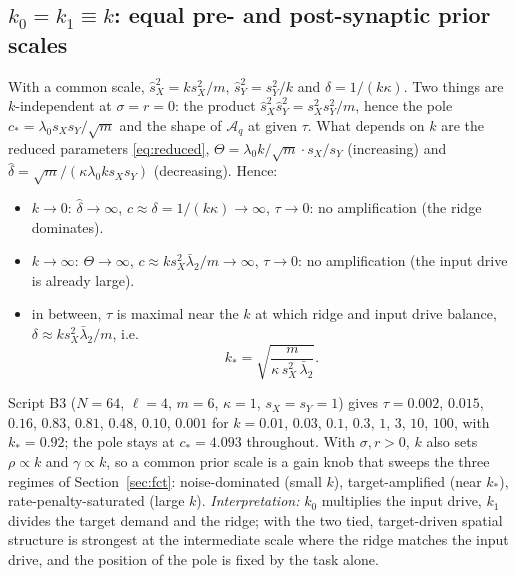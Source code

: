 \documentclass[11pt,a4paper]{article}
\newcommand{\sX}{\hat s_X^2}
\newcommand{\sY}{\hat s_Y^2}
\newcommand{\amp}{\mathcal A}
\theoremstyle{remark}
\begin{document}
\subsection{\texorpdfstring{$k_0 = k_1\equiv k$}{k0 = k1 = k}: equal pre- and post-synaptic prior scales}
\label{sec:k}
With a common scale, $\sX = ks_X^2/m$, $\sY = s_Y^2/k$ and $\delta = 1/(k\kappa)$. Two things are $k$-independent at $\sigma = r = 0$: the product $\sX\sY = s_X^2s_Y^2/m$, hence the pole $c_* = \lambda_0 s_Xs_Y/\sqrt m$ and the shape of $\amp_q$ at given $\tau$. What depends on $k$ are the reduced parameters \eqref{eq:reduced}, $\Theta = \lambda_0k/\sqrt m\cdot s_X/s_Y$ (increasing) and $\hat\delta = \sqrt m/(\kappa\lambda_0ks_Xs_Y)$ (decreasing). Hence:
\begin{itemize}[nosep]
  \item $k\to0$: $\hat\delta\to\infty$, $c\approx\delta = 1/(k\kappa)\to\infty$, $\tau\to0$: no amplification (the ridge dominates).
  \item $k\to\infty$: $\Theta\to\infty$, $c\approx k s_X^2\bar\lambda_2/m\to\infty$, $\tau\to0$: no amplification (the input drive is already large).
  \item in between, $\tau$ is maximal near the $k$ at which ridge and input drive balance, $\delta\approx ks_X^2\bar\lambda_2/m$, i.e.
  \begin{equation}
    k_* = \sqrt{\frac{m}{\kappa\,s_X^2\,\bar\lambda_2}} .
  \end{equation}
\end{itemize}
Script B3 ($N = 64$, $\ell = 4$, $m = 6$, $\kappa = 1$, $s_X = s_Y = 1$) gives $\tau = 0.002$, $0.015$, $0.16$, $0.83$, $0.81$, $0.48$, $0.10$, $0.001$ for $k = 0.01$, $0.03$, $0.1$, $0.3$, $1$, $3$, $10$, $100$, with $k_* = 0.92$; the pole stays at $c_* = 4.093$ throughout.
With $\sigma, r > 0$, $k$ also sets $\rho\propto k$ and $\gamma\propto k$, so a common prior scale is a gain knob that sweeps the three regimes of Section~\ref{sec:fct}: noise-dominated (small $k$), target-amplified (near $k_*$), rate-penalty-saturated (large $k$).
\emph{Interpretation:} $k_0$ multiplies the input drive, $k_1$ divides the target demand and the ridge; with the two tied, target-driven spatial structure is strongest at the intermediate scale where the ridge matches the input drive, and the position of the pole is fixed by the task alone.
\end{document}
